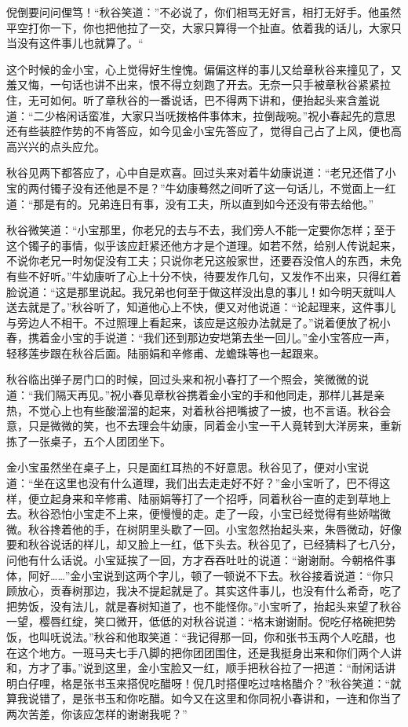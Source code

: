 \documentclass[12pt,UTF8]{ctexbook}
\begin{document}
{{{倪倒要问问俚笃！“秋谷笑道：”不必说了，你们相骂无好言，相打无好手。他虽然平空打你一下，你也把他拉了一交，大家只算得一个扯直。依着我的话儿，大家只当没有这件事儿也就算了。“

这个时候的金小宝，心上觉得好生惶愧。偏偏这样的事儿又给章秋谷来撞见了，又羞又悔，一句话也讲不出来，恨不得立刻跑了开去。无奈一只手被章秋谷紧紧拉住，无可如何。听了章秋谷的一番说话，巴不得两下讲和，便抬起头来含羞说道：“二少格闲话蛮准，大家只当呒拨格件事体末，拉倒哉啘。”祝小春起先的意思还有些装腔作势的不肯答应，如今见金小宝先答应了，觉得自己占了上风，便也高高兴兴的点头应允。

秋谷见两下都答应了，心中自是欢喜。回过头来对着牛幼康说道：“老兄还借了小宝的两付镯子没有还他是不是？”牛幼康蓦然之间听了这一句话儿，不觉面上一红道：“那是有的。兄弟连日有事，没有工夫，所以直到如今还没有带去给他。”

秋谷微笑道：“小宝那里，你老兄的去与不去，我们旁人不能一定要你怎样；至于这个镯子的事情，似乎该应赶紧还他方才是个道理。如若不然，给别人传说起来，不说你老兄一时匆促没有工夫；只说你老兄这般家世，还要吞没倌人的东西，未免有些不好听。”牛幼康听了心上十分不快，待要发作几句，又发作不出来，只得红着脸说道：“这是那里说起。我兄弟也何至于做这样没出息的事儿！如今明天就叫人送去就是了。”秋谷听了，知道他心上不快，便又对他说道：“论起理来，这件事儿与旁边人不相干。不过照理上看起来，该应是这般办法就是了。”说着便放了祝小春，携着金小宝的手说道：“我们还到那边安垲第去坐一回儿。”金小宝答应一声，轻移莲步跟在秋谷后面。陆丽娟和辛修甫、龙蟾珠等也一起跟来。

秋谷临出弹子房门口的时候，回过头来和祝小春打了一个照会，笑微微的说道：“我们隔天再见。”祝小春见章秋谷携着金小宝的手和他同走，那样儿甚是亲热，不觉心上也有些酸溜溜的起来，对着秋谷把嘴披了一披，也不言语。秋谷会意，只是微微的笑，也不去理会牛幼康，同着金小宝一干人竟转到大洋房来，重新拣了一张桌子，五个人团团坐下。

金小宝虽然坐在桌子上，只是面红耳热的不好意思。秋谷见了，便对小宝说道：“坐在这里也没有什么道理，我们出去走走好不好？”金小宝听了，巴不得这样，便立起身来和辛修甫、陆丽娟等打了一个招呼，同着秋谷一直的走到草地上去。秋谷恐怕小宝走不上来，便慢慢的走。走了一段，小宝已经觉得有些娇喘微微。秋谷搀着他的手，在树阴里头歇了一回。小宝忽然抬起头来，朱唇微动，好像要和秋谷说话的样儿，却又脸上一红，低下头去。秋谷见了，已经猜料了七八分，问他有什么话说。小宝延挨了一回，方才吞吞吐吐的说道：“谢谢耐。今朝格件事体，阿好……”金小宝说到这两个字儿，顿了一顿说不下去。秋谷接着说道：“你只顾放心，贡春树那边，我决不提起就是了。其实这件事儿，也没有什么希奇，吃了把势饭，没有法儿，就是春树知道了，也不能怪你。”小宝听了，抬起头来望了秋谷一望，樱唇红绽，笑口微开，低低的对秋谷说道：“格末谢谢耐。倪吃仔格碗把势饭，也叫呒说法。”秋谷和他取笑道：“我记得那一回，你和张书玉两个人吃醋，也在这个地方。一班马夫七手八脚的把你团团围住，还是我挺身出来和你们两个人讲和，方才了事。”说到这里，金小宝脸又一红，顺手把秋谷拉了一把道：“耐闲话讲明白仔哩，格是张书玉来搭倪吃醋呀！倪几时搭俚吃过啥格醋介？”秋谷笑道：“就算我说错了，是张书玉和你吃醋。如今又在这里和你同祝小春讲和，一连和你当了两次苦差，你该应怎样的谢谢我呢？”

}}}
\end{document}

